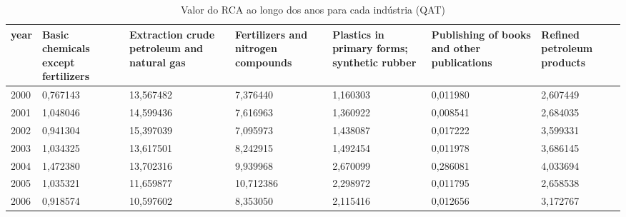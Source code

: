 \begin{table}
\centering
\caption{Valor do RCA ao longo dos anos para cada indústria (QAT)}
\begin{tabular}{p{1cm}p{2cm}p{2cm}p{2cm}p{2cm}p{2cm}p{2cm}}
\toprule
 year &  Basic chemicals except fertilizers &  Extraction crude petroleum and natural gas &  Fertilizers and nitrogen compounds &  Plastics in primary forms; synthetic rubber &  Publishing of books and other publications &  Refined petroleum products \\
\midrule
 2000 &                            0,767143 &                                   13,567482 &                            7,376440 &                                     1,160303 &                                    0,011980 &                    2,607449 \\
 2001 &                            1,048046 &                                   14,599436 &                            7,616963 &                                     1,360922 &                                    0,008541 &                    2,684035 \\
 2002 &                            0,941304 &                                   15,397039 &                            7,095973 &                                     1,438087 &                                    0,017222 &                    3,599331 \\
 2003 &                            1,034325 &                                   13,617501 &                            8,242915 &                                     1,492454 &                                    0,011978 &                    3,686145 \\
 2004 &                            1,472380 &                                   13,702316 &                            9,939968 &                                     2,670099 &                                    0,286081 &                    4,033694 \\
 2005 &                            1,035321 &                                   11,659877 &                           10,712386 &                                     2,298972 &                                    0,011795 &                    2,658538 \\
 2006 &                            0,918574 &                                   10,597602 &                            8,353050 &                                     2,115416 &                                    0,012656 &                    3,172767 \\

\end{tabular}
\end{table}
